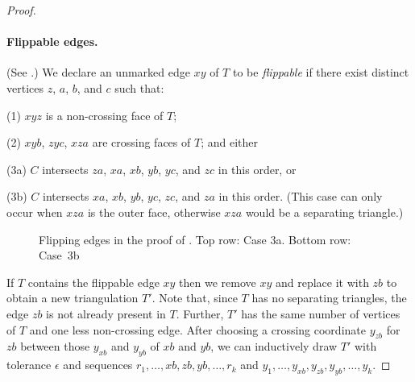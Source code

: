 \begin{proof}
	
\paragraph{Flippable edges.}
	(See .)
	We declare an unmarked edge $xy$ of $T$ to be \emph{flippable} if there
	exist distinct vertices $z$, $a$, $b$, and $c$ such that:
\begin{compactenum}[(11) ]
\item [(1)]
  $xyz$ is a non-crossing face of $T$;
\item [(2)]
  $xyb$, $zyc$, $xza$ are crossing faces of $T$;
  and either 
\item [(3a)] $C$
        intersects $za$, $xa$, $xb$, $yb$, $yc$, and $zc$ in this
        order, or
      \item [(3b)] $C$ intersects $xa$, $xb$, $yb$, $yc$, $zc$,
        and $za$ in this order. (This case can only occur when
        $xza$ is the outer face, otherwise $xza$ would be a separating
        triangle.)
        \end{compactenum}

        
	\begin{figure}
		\caption{Flipping edges in the proof of
			. Top row: Case 3a. Bottom row:
                        Case~3b}
	\end{figure}
	
	If $T$ contains the flippable edge $xy$ then we remove $xy$ and replace it with $zb$ to obtain a new triangulation $T'$. Note that, since $T$ has no separating triangles, the edge $zb$ is not already present in $T$. Further, $T'$ has the same number of vertices of $T$ and one less non-crossing edge. After choosing a crossing coordinate $y_{zb}$ for $zb$ between those $y_{xb}$ and $y_{yb}$ of $xb$ and $yb$, we can inductively draw $T'$ with tolerance $\epsilon$ and sequences $r_1,\dots,xb,zb,yb,\dots,r_k$ and $y_1,\dots,y_{xb},y_{zb},y_{yb},\dots,y_k$.
	

\end{proof}
